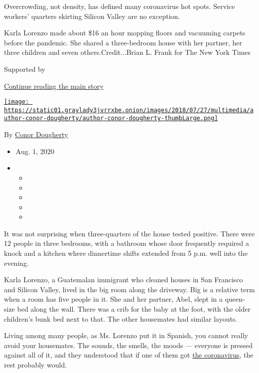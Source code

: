 Overcrowding, not density, has defined many coronavirus hot spots.
Service workers' quarters skirting Silicon Valley are no exception.

Karla Lorenzo made about \$16 an hour mopping floors and vacuuming
carpets before the pandemic. She shared a three-bedroom house with her
partner, her three children and seven others.Credit...Brian L. Frank for
The New York Times

Supported by

\protect\hyperlink{after-sponsor}{Continue reading the main story}

\href{https://www.nytimes3xbfgragh.onion/by/conor-dougherty}{\texttt{[image: https://static01.graylady3jvrrxbe.onion/images/2018/07/27/multimedia/author-conor-dougherty/author-conor-dougherty-thumbLarge.png]}}

By \href{https://www.nytimes3xbfgragh.onion/by/conor-dougherty}{Conor
Dougherty}

\begin{itemize}
\item
  Aug. 1, 2020
\item
  \begin{itemize}
  \item
  \item
  \item
  \item
  \item
  \end{itemize}
\end{itemize}

It was not surprising when three-quarters of the house tested positive.
There were 12 people in three bedrooms, with a bathroom whose door
frequently required a knock and a kitchen where dinnertime shifts
extended from 5 p.m. well into the evening.

Karla Lorenzo, a Guatemalan immigrant who cleaned houses in San
Francisco and Silicon Valley, lived in the big room along the driveway.
Big is a relative term when a room has five people in it. She and her
partner, Abel, slept in a queen-size bed along the wall. There was a
crib for the baby at the foot, with the older children's bunk bed next
to that. The other housemates had similar layouts.

Living among many people, as Ms. Lorenzo put it in Spanish, you cannot
really avoid your housemates. The sounds, the smells, the moods ---
everyone is pressed against all of it, and they understood that if one
of them got
\href{https://www.nytimes3xbfgragh.onion/news-event/coronavirus}{the
coronavirus}, the rest probably would.

